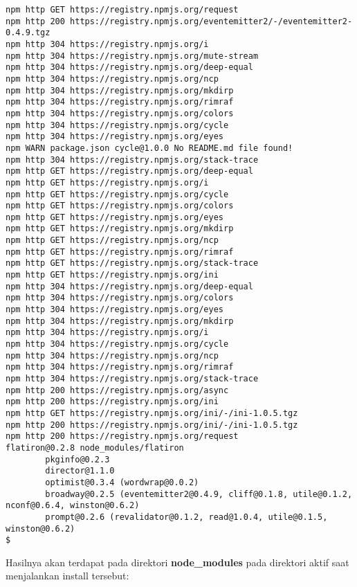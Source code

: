 \begin{lstlisting}
npm http GET https://registry.npmjs.org/request
npm http 200 https://registry.npmjs.org/eventemitter2/-/eventemitter2-0.4.9.tgz
npm http 304 https://registry.npmjs.org/i
npm http 304 https://registry.npmjs.org/mute-stream
npm http 304 https://registry.npmjs.org/deep-equal
npm http 304 https://registry.npmjs.org/ncp
npm http 304 https://registry.npmjs.org/mkdirp
npm http 304 https://registry.npmjs.org/rimraf
npm http 304 https://registry.npmjs.org/colors
npm http 304 https://registry.npmjs.org/cycle
npm http 304 https://registry.npmjs.org/eyes
npm WARN package.json cycle@1.0.0 No README.md file found!
npm http 304 https://registry.npmjs.org/stack-trace
npm http GET https://registry.npmjs.org/deep-equal
npm http GET https://registry.npmjs.org/i
npm http GET https://registry.npmjs.org/cycle
npm http GET https://registry.npmjs.org/colors
npm http GET https://registry.npmjs.org/eyes
npm http GET https://registry.npmjs.org/mkdirp
npm http GET https://registry.npmjs.org/ncp
npm http GET https://registry.npmjs.org/rimraf
npm http GET https://registry.npmjs.org/stack-trace
npm http GET https://registry.npmjs.org/ini
npm http 304 https://registry.npmjs.org/deep-equal
npm http 304 https://registry.npmjs.org/colors
npm http 304 https://registry.npmjs.org/eyes
npm http 304 https://registry.npmjs.org/mkdirp
npm http 304 https://registry.npmjs.org/i
npm http 304 https://registry.npmjs.org/cycle
npm http 304 https://registry.npmjs.org/ncp
npm http 304 https://registry.npmjs.org/rimraf
npm http 304 https://registry.npmjs.org/stack-trace
npm http 200 https://registry.npmjs.org/async
npm http 200 https://registry.npmjs.org/ini
npm http GET https://registry.npmjs.org/ini/-/ini-1.0.5.tgz
npm http 200 https://registry.npmjs.org/ini/-/ini-1.0.5.tgz
npm http 200 https://registry.npmjs.org/request
flatiron@0.2.8 node_modules/flatiron
        pkginfo@0.2.3
        director@1.1.0
        optimist@0.3.4 (wordwrap@0.0.2)
        broadway@0.2.5 (eventemitter2@0.4.9, cliff@0.1.8, utile@0.1.2, nconf@0.6.4, winston@0.6.2)
        prompt@0.2.6 (revalidator@0.1.2, read@1.0.4, utile@0.1.5, winston@0.6.2)
$
\end{lstlisting}

Hasilnya akan terdapat pada direktori \textbf{node\_modules} pada direktori aktif saat menjalankan install tersebut:


